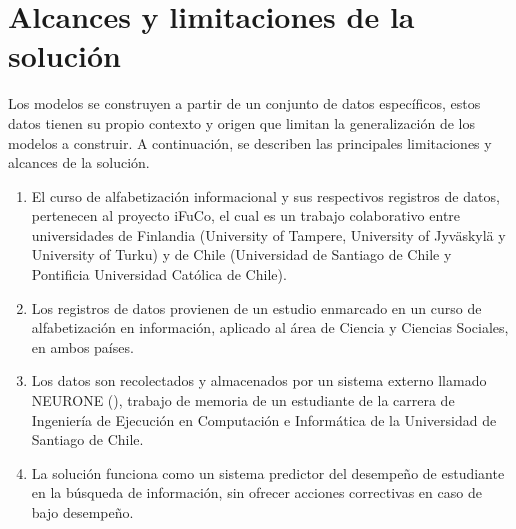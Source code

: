 \section{Alcances y limitaciones de la solución}
\label{sec:alcances}
Los modelos se construyen a partir de un conjunto de datos específicos, estos datos tienen su propio contexto y origen que limitan la generalización de los modelos a construir. A continuación, se describen las principales limitaciones y alcances de la solución.

\begin{enumerate}
	\item El curso de alfabetización informacional y sus respectivos registros de datos, pertenecen al proyecto iFuCo, el cual es un trabajo colaborativo entre universidades de Finlandia (University of Tampere, University of Jyväskylä y University of Turku) y de Chile (Universidad de Santiago de Chile y Pontificia Universidad Católica de Chile). 
	\item Los registros de datos provienen de un estudio enmarcado en un curso de alfabetización en información, aplicado al área de Ciencia y Ciencias Sociales, en ambos países.
	\item Los datos son recolectados y almacenados por un sistema externo llamado NEURONE (), trabajo de memoria de un estudiante de la carrera de Ingeniería de Ejecución en Computación e Informática de la Universidad de Santiago de Chile.
	\item La solución funciona como un sistema predictor del desempeño de estudiante en la búsqueda de información, sin ofrecer acciones correctivas en caso de bajo desempeño.
\end{enumerate}